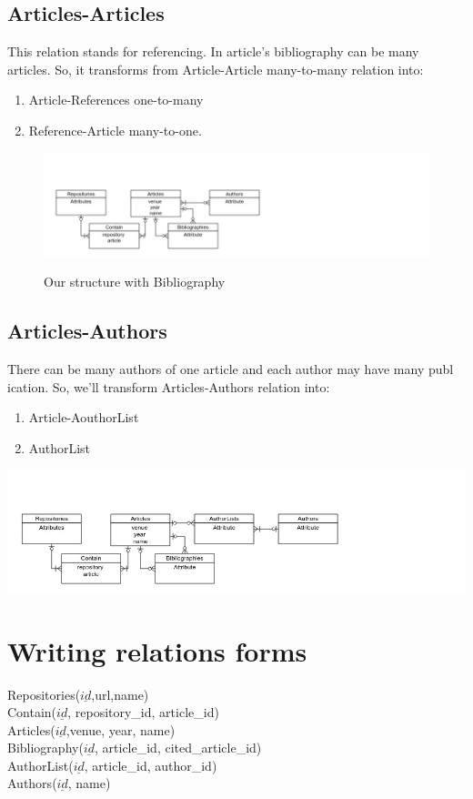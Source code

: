 \documentclass[12pt,a4paper]{article}
\begin{document}
\subsection{Articles-Articles}
This relation stands for referencing. In article's bibliography can be many articles. So, it transforms from Article-Article many-to-many relation into:
\begin{enumerate}
\item Article-References one-to-many
\item Reference-Article many-to-one.
\end{enumerate}
\begin{figure}[h]
\includegraphics[scale=0.65791]{media/figure3.jpg}\\
\caption{Our structure with Bibliography}
\end{figure}

\subsection{Articles-Authors}
There can be many authors of one article and each author may have many publ
ication. So, we'll transform Articles-Authors relation into:
\begin{enumerate}
\item Article-AouthorList
\item AuthorList
\end{enumerate}
\includegraphics[scale=0.585791]{media/figure4.jpg}

\section{Writing relations forms}
Repositories($\underline{id}$,url,name)\\
Contain($\underline{id}$, repository\_id, article\_id)\\
Articles($\underline{id}$,venue, year, name)\\
Bibliography($\underline{id}$, article\_id, cited\_article\_id)\\
AuthorList($\underline{id}$, article\_id, author\_id)\\
Authors($\underline{id}$, name)
\end{document}

